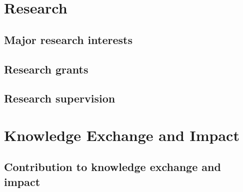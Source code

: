 \documentclass[11pt,a4paper]{moderncv}
\begin{document}
\section{Research}

\subsection{Major research interests}
\vspace{-1.75em}

\subsection{Research grants}
\vspace{-1.75em}

\subsection{Research supervision}
\vspace{-1.75em}

\section{Knowledge Exchange and Impact}

\subsection{Contribution to knowledge exchange and impact}
\vspace{-1.75em}
\end{document}
